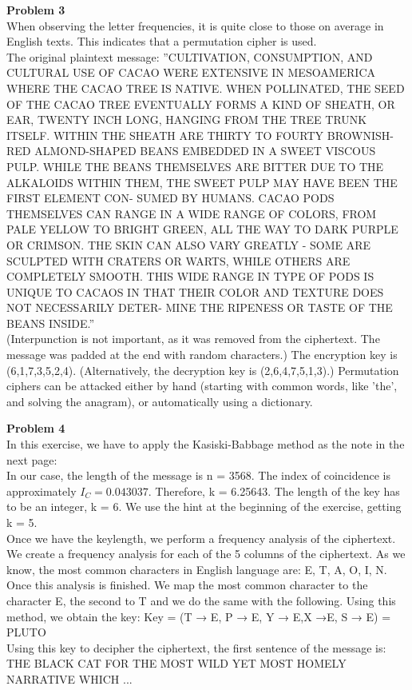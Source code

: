 \documentclass[a4paper, 11pt]{article}
\newenvironment{problem}[2][Problem]
    { \begin{mdframed}[backgroundcolor=gray!20] \textbf{#1 #2} \\}
    {  \end{mdframed}}
\begin{document}
\begin{problem}{3}
When observing the letter frequencies, it is quite close to those
on average in English texts. This indicates that
a permutation cipher is used.\\
The original plaintext message:
”CULTIVATION, CONSUMPTION, AND CULTURAL USE OF CACAO
WERE EXTENSIVE IN MESOAMERICA WHERE THE CACAO TREE
IS NATIVE. WHEN POLLINATED, THE SEED OF THE CACAO TREE
EVENTUALLY FORMS A KIND OF SHEATH, OR EAR, TWENTY INCH
LONG, HANGING FROM THE TREE TRUNK ITSELF. WITHIN THE
SHEATH ARE THIRTY TO FOURTY BROWNISH-RED ALMOND-SHAPED
BEANS EMBEDDED IN A SWEET VISCOUS PULP. WHILE THE BEANS
THEMSELVES ARE BITTER DUE TO THE ALKALOIDS WITHIN THEM,
THE SWEET PULP MAY HAVE BEEN THE FIRST ELEMENT CON-
SUMED BY HUMANS. CACAO PODS THEMSELVES CAN RANGE IN
A WIDE RANGE OF COLORS, FROM PALE YELLOW TO BRIGHT
GREEN, ALL THE WAY TO DARK PURPLE OR CRIMSON. THE SKIN
CAN ALSO VARY GREATLY - SOME ARE SCULPTED WITH CRATERS
OR WARTS, WHILE OTHERS ARE COMPLETELY SMOOTH. THIS
WIDE RANGE IN TYPE OF PODS IS UNIQUE TO CACAOS IN THAT
THEIR COLOR AND TEXTURE DOES NOT NECESSARILY DETER-
MINE THE RIPENESS OR TASTE OF THE BEANS INSIDE.”\\
(Interpunction is not important, as it was removed from the ciphertext. The
message was padded at the end with random characters.)
The encryption key is (6,1,7,3,5,2,4).
(Alternatively, the decryption key is (2,6,4,7,5,1,3).)
Permutation ciphers can be attacked either by hand (starting with common
words, like ’the’, and solving the anagram), or automatically using a dictionary.

\end{problem}
\begin{problem}{4}
In this exercise, we have to apply the Kasiski-Babbage method as the note in the next page:\\
In our case, the length of the message is n = 3568. The index of coincidence is approximately
$I_C = 0.043037$. Therefore, k = 6.25643. The length of the key has to be an integer, k = 6.
We use the hint at the beginning of the exercise, getting k = 5.\\
Once we have the keylength, we perform a frequency analysis of the ciphertext. We create a
frequency analysis for each of the 5 columns of the ciphertext. As we know, the most common
characters in English language are: E, T, A, O, I, N.\\
Once this analysis is finished. We map the most common character to the character E, the
second to T and we do the same with the following. Using this method, we obtain the key:
Key = (T → E, P → E, Y → E,X →E, S → E) = PLUTO\\
Using this key to decipher the ciphertext, the first sentence of the message is: THE BLACK
CAT FOR THE MOST WILD YET MOST HOMELY NARRATIVE WHICH ...

\end{problem}
\end{document}
